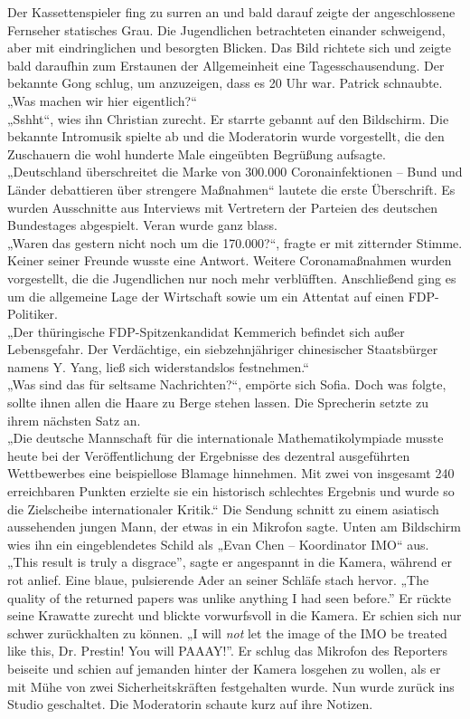 \documentclass[oneside]{memoir}
\begin{document}
     \bigskip \bigskip \bigskip \bigskip
     Der Kassettenspieler fing zu surren an und bald darauf zeigte der angeschlossene Fernseher statisches Grau. Die Jugendlichen betrachteten einander schweigend, aber mit eindringlichen und besorgten Blicken. Das Bild richtete sich und zeigte bald daraufhin zum Erstaunen der Allgemeinheit eine Tagesschausendung. Der bekannte Gong schlug, um anzuzeigen, dass es 20 Uhr war. Patrick schnaubte.
„Was machen wir hier eigentlich?“ \\
„Sshht“, wies ihn Christian zurecht. Er starrte gebannt auf den Bildschirm. Die bekannte Intromusik spielte ab und die Moderatorin wurde vorgestellt, die den Zuschauern die wohl hunderte Male eingeübten Begrüßung aufsagte. \\
„Deutschland überschreitet die Marke von 300.000 Coronainfektionen – Bund und Länder debattieren über strengere Maßnahmen“ lautete die erste Überschrift. Es wurden Ausschnitte aus Interviews mit Vertretern der Parteien des deutschen Bundestages abgespielt. Veran wurde ganz blass. \\
„Waren das gestern nicht noch um die 170.000?“, fragte er mit zitternder Stimme. Keiner seiner Freunde wusste eine Antwort. Weitere Coronamaßnahmen wurden vorgestellt, die die Jugendlichen nur noch mehr verblüfften. Anschließend ging es um die allgemeine Lage der Wirtschaft sowie um ein Attentat auf einen FDP-Politiker. \\
„Der thüringische FDP-Spitzenkandidat Kemmerich befindet sich außer Lebensgefahr. Der Verdächtige, ein siebzehnjähriger chinesischer Staatsbürger namens Y. Yang, ließ sich widerstandslos festnehmen.“ \\
„Was sind das für seltsame Nachrichten?“, empörte sich Sofia. Doch was folgte, sollte ihnen allen die Haare zu Berge stehen lassen. Die Sprecherin setzte zu ihrem nächsten Satz an. \\
„Die deutsche Mannschaft für die internationale Mathematikolympiade musste heute bei der Veröffentlichung der Ergebnisse des dezentral ausgeführten Wettbewerbes eine beispiellose Blamage hinnehmen. Mit zwei von insgesamt 240 erreichbaren Punkten erzielte sie ein historisch schlechtes Ergebnis und wurde so die Zielscheibe internationaler Kritik.“
Die Sendung schnitt zu einem asiatisch aussehenden jungen Mann, der etwas in ein Mikrofon sagte. Unten am Bildschirm wies ihn ein eingeblendetes Schild als „Evan Chen – Koordinator IMO“ aus. \\
„This result is truly a disgrace”, sagte er angespannt in die Kamera, während er rot anlief. Eine blaue, pulsierende Ader an seiner Schläfe stach hervor. „The quality of the returned papers was unlike anything I had seen before.” Er rückte seine Krawatte zurecht und blickte vorwurfsvoll in die Kamera. Er schien sich nur schwer zurückhalten zu können. „I will \textit{not} let the image of the IMO be treated like this, Dr. Prestin! You will PAAAY!”. Er schlug das Mikrofon des Reporters beiseite und schien auf jemanden hinter der Kamera losgehen zu wollen, als er mit Mühe von zwei Sicherheitskräften festgehalten wurde. Nun wurde zurück ins Studio geschaltet. Die Moderatorin schaute kurz auf ihre Notizen. \\
\end{document}
